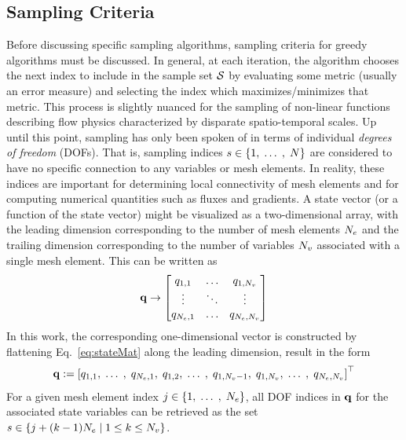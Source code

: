 \subsection{Sampling Criteria}\label{subsec:samplingCriteria}
%
Before discussing specific sampling algorithms, sampling criteria for greedy algorithms must be discussed. In general, at each iteration, the algorithm chooses the next index to include in the sample set $\mathcal{S}$ by evaluating some metric (usually an error measure) and selecting the index which maximizes/minimizes that metric. This process is slightly nuanced for the sampling of non-linear functions describing flow physics characterized by disparate spatio-temporal scales. Up until this point, sampling has only been spoken of in terms of individual \textit{degrees of freedom} (DOFs). That is, sampling indices $s \in \{1,\; \hdots \;, \; N\}$ are considered to have no specific connection to any variables or mesh elements. In reality, these indices are important for determining local connectivity of mesh elements and for computing numerical quantities such as fluxes and gradients. A state vector (or a function of the state vector) might be visualized as a two-dimensional array, with the leading dimension corresponding to the number of mesh elements $N_{e}$ and the trailing dimension corresponding to the number of variables $N_{v}$ associated with a single mesh element. This can be written as
%
\begin{equation}\label{eq:stateMat}
	\mathbf{q} \rightarrow
	\begin{bmatrix}
		q_{1,1} & \hdots & q_{1,N_{v}} \\
		\vdots & \ddots & \vdots \\
		q_{N_{e},1} & \hdots & q_{N_{e},N_{v}}
	\end{bmatrix}
\end{equation}
%
In this work, the corresponding one-dimensional vector is constructed by flattening Eq.~\ref{eq:stateMat} along the leading dimension, result in the form
%
\begin{equation}
	\mathbf{q} := \left[q_{1,1}, \; \hdots \;, \; q_{N_{e},1}, \; q_{1,2}, \; \hdots \;, \; q_{1,N_{v}-1}, \; q_{1,N_{v}}, \; \hdots \;, \; q_{N_{e},N_{v}} \right]^\top
\end{equation}
%
For a given mesh element index $j \in \{1,\; \hdots \;,\; N_{e}\}$, all DOF indices in $\mathbf{q}$ for the associated state variables can be retrieved as the set $s \in \{j + (k-1) N_{e} \; \vert \; 1 \le k \le N_{v} \}$.

